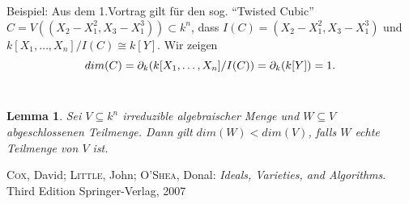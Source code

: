 \documentclass{article}
\newtheorem{lemma}[satz]{Lemma}
\newcommand*{\R}{k[X_{1},\ldots,X_{n}]}
\newcommand*{\indx}[2]{{#1}_{#2}}
\begin{document}
Beispiel: Aus dem 1.Vortrag gilt für den sog. \textquotedblleft Twisted Cubic\textquotedblright \;      $C=V((\indx{X}{2}-\indx{X}{1}^2,\indx{X}{3}-\indx{X}{1}^3))\subset k^n$, dass $I(C)=(\indx{X}{2}-\indx{X}{1}^2,\indx{X}{3}-\indx{X}{1}^3)$ und $\R/I(C)\cong k[Y]$. Wir zeigen
\begin{displaymath}
dim(C)=\indx{\partial}{k}(\R/I(C))=\indx{\partial}{k}(k[Y])=1.\\
\end{displaymath} 
\\

\begin{lemma}
	Sei $V\subseteq k^n$ irreduzible algebraischer Menge und $W\subseteq V$ abgeschlossenen Teilmenge. Dann gilt $dim(W)<dim(V)$, falls $W$ echte Teilmenge von $V$ ist.
\end{lemma} 


\begin{thebibliography}{99}
	\textsc{Cox}, David; \textsc{Little}, John; \textsc{O'Shea}, Donal:
	\newblock \emph{Ideals, Varieties, and Algorithms}.
	\newblock Third Edition
	\newblock Springer-Verlag, 2007
\end{thebibliography}
\end{document}
